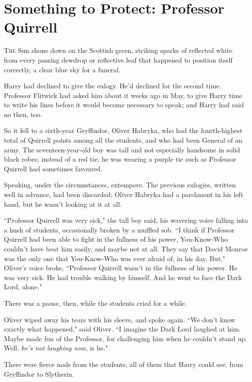 \chapter{Something to Protect: Professor Quirrell}

\lettrine{T}{he} Sun shone down on the Scottish green, striking sparks of reflected white from every passing dewdrop or reflective leaf that happened to position itself correctly, a clear blue sky for a funeral.

Harry had declined to give the eulogy. He'd declined for the second time. Professor Flitwick had asked him about it weeks ago in May, to give Harry time to write his lines before it would become necessary to speak; and Harry had said no then, too.

So it fell to a sixth-year Gryffindor, Oliver Habryka, who had the fourth-highest total of Quirrell points among all the students, and who had been General of an army. The seventeen-year-old boy was tall and not especially handsome in solid black robes; instead of a red tie, he was wearing a purple tie such as Professor Quirrell had sometimes favoured.

Speaking, under the circumstances, extempore. The previous eulogies, written well in advance, had been discarded; Oliver Habryka had a parchment in his left hand, but he wasn't looking at it at all.

``Professor Quirrell was very sick," the tall boy said, his wavering voice falling into a hush of students, occasionally broken by a muffled sob. ``I think if Professor Quirrell had been able to fight in the fullness of his power, You-Know-Who couldn't have beat him easily, and maybe not at all. They say that David Monroe was the only one that You-Know-Who was ever afraid of, in his day. But," Oliver's voice broke, ``Professor Quirrell wasn't in the fullness of his power. He was very sick. He had trouble walking by himself. And he went to face the Dark Lord, alone."

There was a pause, then, while the students cried for a while.

Oliver wiped away his tears with his sleeve, and spoke again. ``We don't know exactly what happened," said Oliver. ``I imagine the Dark Lord laughed at him. Maybe made fun of the Professor, for challenging him when he couldn't stand up. Well, \emph{he's not laughing now}, is he."

There were fierce nods from the students; all of them that Harry could see, from Gryffindor to Slytherin.

